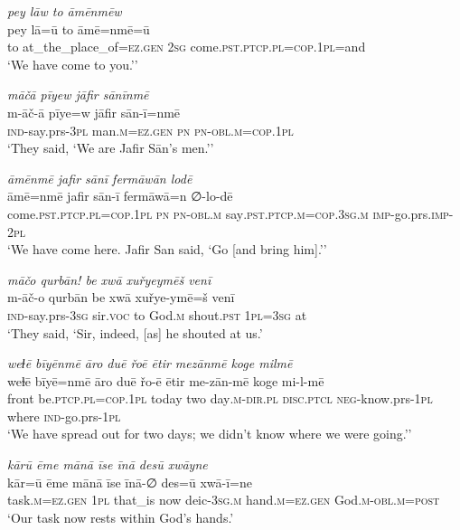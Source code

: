 \ea \label{ŠJ.32}
\textit{pey lāw to āmēnmēw} \\ 
\gll pey lā=ū to āmē=nmē=ū \\ 
 to at\_the\_place\_of\textsc{=ez.gen} \textsc{2sg} come\textsc{.pst}\textsc{.ptcp}\textsc{.pl}\textsc{=cop}\textsc{.\textsc{1pl}}=and \\ 
\glt `We have come to you.’'
\z 
 
\ea \label{ŠJ.34}
\textit{māčā pīyew jāfir sānīnmē} \\ 
\gll m-āč-ā pīye=w jāfir sān-ī=nmē \\ 
 \textsc{ind-}say.prs\textsc{-3pl} man\textsc{.m}\textsc{=ez.gen} \textsc{pn} \textsc{pn}\textsc{-obl}\textsc{.m}\textsc{=cop}\textsc{.\textsc{1pl}} \\ 
\glt `They said, ‘We are Jafir Sān’s men.’'
\z 
 
\ea \label{ŠJ.36}
\textit{āmēnmē jafir sānī fermāwān lodē} \\ 
\gll āmē=nmē jafir sān-ī fermāwā=n ∅-lo-dē \\ 
 come\textsc{.pst}\textsc{.ptcp}\textsc{.pl}\textsc{=cop}\textsc{.\textsc{1pl}} \textsc{pn} \textsc{pn}\textsc{-obl}\textsc{.m} say\textsc{.pst}\textsc{.ptcp}\textsc{.m}\textsc{=cop}\textsc{.3sg}\textsc{.m} \textsc{imp-}go.prs.\textsc{imp-}\textsc{2pl} \\ 
\glt `We have come here. Jafir San said, ‘Go [and bring him].’'
\z 
 
\ea \label{ŠJ.44}
\textit{māčo qurbān! be xwā xuřyeymēš venī} \\ 
\gll m-āč-o qurbān be xwā xuřye-ymē=š venī \\ 
 \textsc{ind-}say.prs\textsc{-3sg} sir.\textsc{voc} to God\textsc{.m} shout\textsc{.pst} \textsc{1pl}\textsc{=3sg} at \\ 
\glt `They said, ‘Sir, indeed, [as] he shouted at us.'
\z 
 
\ea \label{ŠJ.45}
\textit{weɫē bīyēnmē āro duē řoē ētir mezānmē koge milmē} \\ 
\gll weɫē bīyē=nmē āro duē řo-ē ētir me-zān-mē koge mi-l-mē \\ 
 front be\textsc{.ptcp}\textsc{.pl}\textsc{=cop}\textsc{.\textsc{1pl}} today two day\textsc{.m}\textsc{-dir}\textsc{.pl} \textsc{disc.ptcl} \textsc{neg-}know.prs\textsc{-\textsc{1pl}} where \textsc{ind-}go.prs\textsc{-\textsc{1pl}} \\ 
\glt `We have spread out for two days; we didn’t know where we were going.’'
\z 
 
\ea \label{ŠJ.88}
\textit{kārū ēme mānā īse īnā desū xwāyne} \\ 
\gll kār=ū ēme mānā īse īnā-∅ des=ū xwā-ī=ne \\ 
 task\textsc{.m}\textsc{=ez.gen} \textsc{1pl} that\_is now deic\textsc{-3sg}\textsc{.m} hand\textsc{.m}\textsc{=ez.gen} God\textsc{.m}\textsc{-obl}\textsc{.m}\textsc{=\textsc{post}} \\ 
\glt `Our task now rests within God’s hands.'
\z 
 

